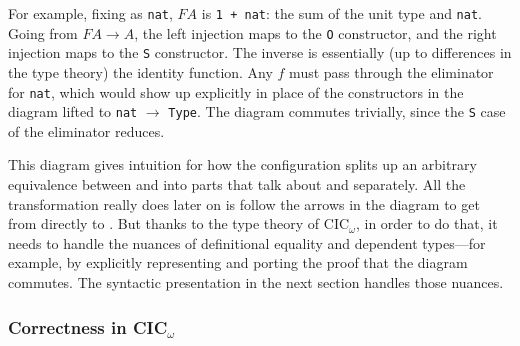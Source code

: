 For example, fixing \Aa as \lstinline{nat}, $F A$ is \lstinline{1 + nat}:
the sum of the unit type and \lstinline{nat}.
Going from $F A \rightarrow A$, the left injection maps to the \lstinline{O} constructor, and the right injection maps to the \lstinline{S} constructor.
The inverse is essentially (up to differences in the type theory) the identity function.
Any $f$ must pass through the eliminator for \lstinline{nat}, which would show up explicitly in place of the constructors
in the diagram lifted to \lstinline{nat} $\rightarrow$ \lstinline{Type}.
The diagram commutes trivially, since the \lstinline{S} case of the eliminator reduces.

This diagram gives intuition for how the configuration splits up an arbitrary equivalence between \Aa and \B into
parts that talk about \Aa and \B separately. All the transformation really does later on is follow the arrows
in the diagram to get from \Aa directly to \B.
But thanks to the type theory of CIC${_\omega}$, in order to do that, it needs to handle the nuances of definitional equality
and dependent types---for example, by explicitly representing and porting the proof that the diagram commutes.
The syntactic presentation in the next section handles those nuances.

\subsubsection{Correctness in CIC$_{\omega}$}
\label{sec:correct-cic}


